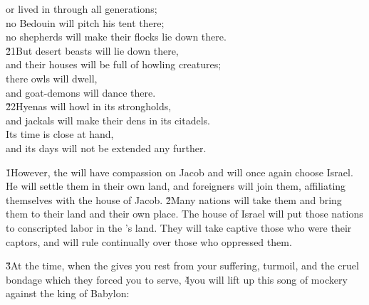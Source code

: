 \begin{poetry}
\poemll    or lived in through all generations; \\
\poeml no Bedouin will pitch his tent there; \\
\poemll    no shepherds will make their flocks lie down there. \\
\poeml \v{21}But desert beasts will lie down there, \\
\poemll    and their houses will be full of howling creatures; \\
\poeml there owls will dwell, \\
\poemll    and goat-demons will dance there. \\
\poeml \v{22}Hyenas will howl in its strongholds, \\
\poemll    and jackals will make their dens in its citadels. \\
\poeml Its time is close at hand, \\
\poemll    and its days will not be extended any further.
\end{poetry}

\v{1}However, the  will have compassion on Jacob and will once again choose Israel. He will settle them in their own land, and foreigners will join them, affiliating themselves with the house of Jacob. \v{2}Many nations will take them and bring them to their land and their own place. The house of Israel will put those nations to conscripted labor in the 's land. They will take captive those who were their captors, and will rule continually over those who oppressed them.

\v{3}At the time, when the  gives you rest from your suffering, turmoil, and the cruel bondage which they forced you to serve, \v{4}you will lift up this song of mockery against the king of Babylon:

